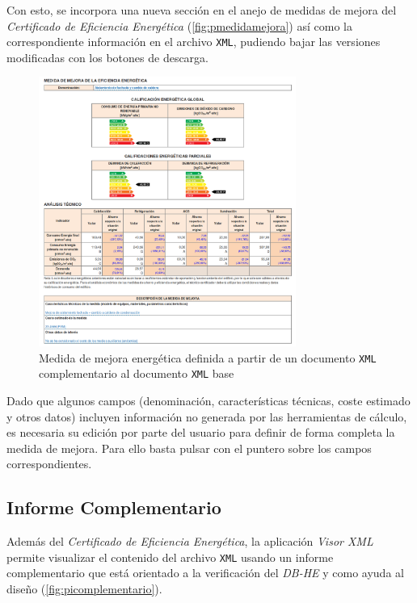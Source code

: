 \documentclass[10pt,notitlepage,oneside,a4paper]{article}
\begin{document}
Con esto, se incorpora una nueva sección en el anejo de medidas de mejora del \textit{Certificado de Eficiencia Energética} (\autoref{fig:pmedidamejora}) así como la correspondiente información en el archivo \texttt{XML}, pudiendo bajar las versiones modificadas con los botones de descarga.

\begin{figure}[H]
  \centering
  \includegraphics[width=0.75\textwidth]{imagenes/pmedidamejora}  
  \caption{Medida de mejora energética definida a partir de un documento \texttt{XML} complementario al documento \texttt{XML} base}
  \label{fig:pmedidamejora}
\end{figure}

Dado que algunos campos (denominación, características técnicas, coste estimado y otros datos) incluyen información no generada por las herramientas de cálculo, es necesaria su edición por parte del usuario para definir de forma completa la medida de mejora. Para ello basta pulsar con el puntero sobre los campos correspondientes.

\subsection{Informe Complementario}

Además del \textit{Certificado de Eficiencia Energética}, la aplicación \textit{Visor XML} permite visualizar el contenido del archivo \texttt{XML} usando un informe complementario que está orientado a la verificación del \textit{DB-HE} y como ayuda al diseño (\autoref{fig:picomplementario}).
\end{document}

